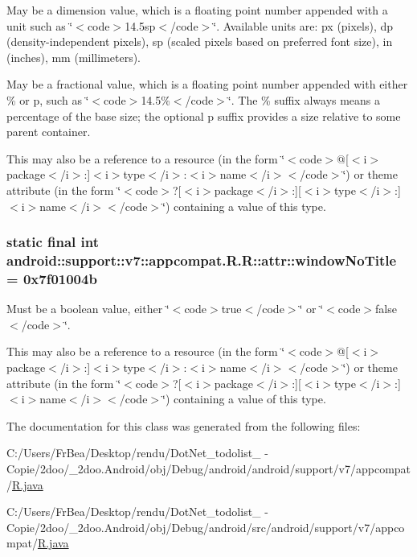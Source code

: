 May be a dimension value, which is a floating point number appended with a unit such as \char`\"{}$<$code$>$14.5sp$<$/code$>$\char`\"{}. Available units are: px (pixels), dp (density-independent pixels), sp (scaled pixels based on preferred font size), in (inches), mm (millimeters). 

May be a fractional value, which is a floating point number appended with either \% or p, such as \char`\"{}$<$code$>$14.5\%$<$/code$>$\char`\"{}. The \% suffix always means a percentage of the base size; the optional p suffix provides a size relative to some parent container. 

This may also be a reference to a resource (in the form \char`\"{}$<$code$>$@\mbox{[}$<$i$>$package$<$/i$>$:\mbox{]}$<$i$>$type$<$/i$>$:$<$i$>$name$<$/i$>$$<$/code$>$\char`\"{}) or theme attribute (in the form \char`\"{}$<$code$>$?\mbox{[}$<$i$>$package$<$/i$>$:\mbox{]}\mbox{[}$<$i$>$type$<$/i$>$:\mbox{]}$<$i$>$name$<$/i$>$$<$/code$>$\char`\"{}) containing a value of this type. \hypertarget{classandroid_1_1support_1_1v7_1_1appcompat_1_1_r_1_1attr_33ab908bf294c88988778e867e8c4602}{
\subsubsection[{windowNoTitle}]{\setlength{\rightskip}{0pt plus 5cm}static final int android::support::v7::appcompat.R.R::attr::windowNoTitle = 0x7f01004b}}
\label{classandroid_1_1support_1_1v7_1_1appcompat_1_1_r_1_1attr_33ab908bf294c88988778e867e8c4602}


Must be a boolean value, either \char`\"{}$<$code$>$true$<$/code$>$\char`\"{} or \char`\"{}$<$code$>$false$<$/code$>$\char`\"{}. 

This may also be a reference to a resource (in the form \char`\"{}$<$code$>$@\mbox{[}$<$i$>$package$<$/i$>$:\mbox{]}$<$i$>$type$<$/i$>$:$<$i$>$name$<$/i$>$$<$/code$>$\char`\"{}) or theme attribute (in the form \char`\"{}$<$code$>$?\mbox{[}$<$i$>$package$<$/i$>$:\mbox{]}\mbox{[}$<$i$>$type$<$/i$>$:\mbox{]}$<$i$>$name$<$/i$>$$<$/code$>$\char`\"{}) containing a value of this type. 

The documentation for this class was generated from the following files:\begin{CompactItemize}
\item 
C:/Users/FrBea/Desktop/rendu/DotNet\_\-todolist\_ - Copie/2doo/\_\-2doo.Android/obj/Debug/android/android/support/v7/appcompat/\hyperlink{android_2support_2v7_2appcompat_2_r_8java}{R.java}\item 
C:/Users/FrBea/Desktop/rendu/DotNet\_\-todolist\_ - Copie/2doo/\_\-2doo.Android/obj/Debug/android/src/android/support/v7/appcompat/\hyperlink{src_2android_2support_2v7_2appcompat_2_r_8java}{R.java}\end{CompactItemize}
